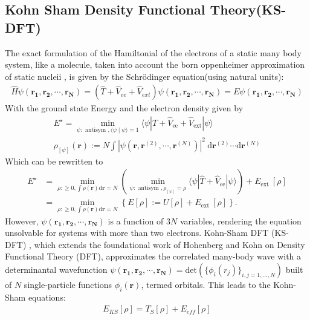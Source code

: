\subsection{Kohn Sham Density Functional Theory(KS-DFT)}
The exact formulation of the Hamiltonial of the electrons of a static many body system, like a molecule, taken into account the born oppenheimer approximation of static nucleii , is given by the Schrödinger equation(using natural units):
\begin{align}
    \hat{H}\psi(\mathbf{r_1},\mathbf{r_2},\cdots,\mathbf{r_N}) =(\hat{T} + \hat V_{ee} + \hat V_{ext})\psi(\mathbf{r_1},\mathbf{r_2},\cdots,\mathbf{r_N}) = E\psi(\mathbf{r_1},\mathbf{r_2},\cdots,\mathbf{r_N})
\end{align}
With the ground state Energy and the electron density given by
\begin{align}
    E^{\star}=\min _{\psi: \text { antisym },\langle\psi \mid \psi\rangle=1}\langle\psi| \hat{T}+\hat{V}_{\mathrm{ee}}+\hat{V}_{\mathrm{ext}}|\psi\rangle\\
    \rho_{[\psi]}(\mathbf{r}):=N \int\left|\psi\left(\mathbf{r}, \mathbf{r}^{(2)}, \cdots, \mathbf{r}^{(N)}\right)\right|^2 \mathrm{~d} \mathbf{r}^{(2)} \cdots \mathrm{d} \mathbf{r}^{(N)}
\end{align}
Which can be rewritten to
\begin{align}\label{eq:energy_density}
     E^{\star} & =\min _{\rho: \geqslant 0, \int \rho(\mathbf{r}) \mathrm{d} \mathbf{r}=N}\left(\min _{\psi: \text { antisym }, \rho_{[\psi]}=\rho}\langle\psi| \hat{T}+\hat{V}_{\mathrm{ee}}|\psi\rangle\right)+E_{\text {ext }}[\rho] \\ & =\min _{\rho: \geqslant 0, \int \rho(\mathbf{r}) \mathrm{d} \mathbf{r}=N}\left\{E[\rho]:=U[\rho]+E_{\text {ext }}[\rho]\right\} .
\end{align}
However, $\psi(\mathbf{r_1},\mathbf{r_2},\cdots,\mathbf{r_N})$ is a function of $3N$ variables, rendering the equation unsolvable for systems with more than two electrons. Kohn-Sham DFT (KS-DFT) \cite{kohn_self-consistent_1965}, which extends the foundational work of Hohenberg and Kohn \cite{hohenberg_inhomogeneous_1964} on Density Functional Theory (DFT), approximates the correlated many-body wave with a determinantal wavefunction $\psi(\mathbf{r_1},\mathbf{r_2},\cdots,\mathbf{r_N}) = \text{det}(\{\phi_i(r_j)\}_{i,j=1,...,N})$ built of $N$ single-particle functions $\phi_i(\mathbf{r})$, termed orbitals. This leads to the Kohn-Sham equations:
\begin{align}
    E_{KS}[\rho] = T_S[\rho] + E_{eff}[\rho]
\end{align}
